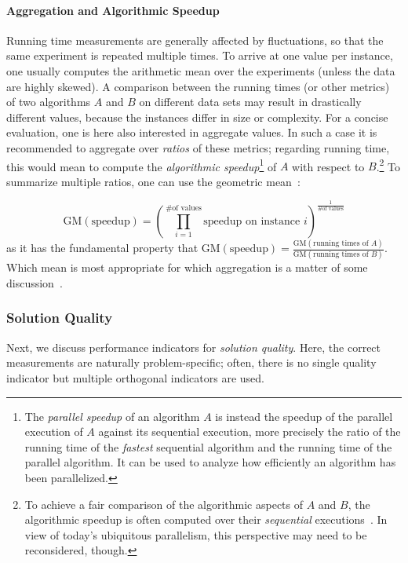 \documentclass[algorithms,article,submit,moreauthors,pdftex]{Definitions/mdpi}
\newcommand{\changed}[1]{#1}
\begin{document}
\paragraph*{Aggregation and Algorithmic Speedup}
%
Running time measurements are generally affected by fluctuations, so that the same experiment
is repeated multiple times. To arrive at one value per instance, one usually computes the arithmetic mean
over the experiments (unless the data are highly skewed).
%
A comparison between the running times (or other metrics) of two algorithms $A$ and $B$ on different
data sets may result in drastically different values, \eg because the instances differ in size or
complexity. For a concise evaluation, one is here also interested in aggregate values.
In such a case it is recommended to aggregate over \emph{ratios} of these metrics;
regarding running time, this would mean to compute the \textit{algorithmic speedup}\footnote{The \emph{parallel speedup} of an algorithm $A$ is instead the speedup of the parallel execution of $A$ against its sequential execution, more precisely the ratio of the running time of the \emph{fastest} sequential algorithm and the running time of the parallel algorithm.
It can be used to analyze how efficiently an algorithm has been parallelized.
}
of $A$ with respect to $B$.\footnote{To achieve a fair comparison of the algorithmic aspects of $A$ and $B$, the algorithmic speedup is often computed over their \emph{sequential} executions~\cite{hennessy2011computer}.
In view of today's ubiquitous parallelism, this perspective may need to be reconsidered, though. %
}
%
To summarize multiple ratios, one can use the geometric mean~\cite{bixby2002solving}:

\[
  \mathrm{GM}(\text{speedup}) = \left(\prod_{i = 1}^{\text{\# of values}}{\text{speedup on instance }i}\right)^{\frac{1}{\text{\# of values}}}
\]
as it has the fundamental property that
$\mathrm{GM}(\text{speedup}) =
\frac{\mathrm{GM}(\text{running times of }A)}{\mathrm{GM}(\text{running times of }B)}$.
	Which mean is most appropriate for which aggregation is a matter of some discussion~\cite{mitchell200488,DBLP:journals/cacm/Smith88,DBLP:journals/cacm/FlemingW86}.

\subsubsection{Solution Quality}

Next, we discuss \changed{performance indicators} for \emph{solution quality}. Here,
the correct measurements are naturally problem-specific;
often, there is no single quality indicator but multiple orthogonal indicators are used.
\end{document}
